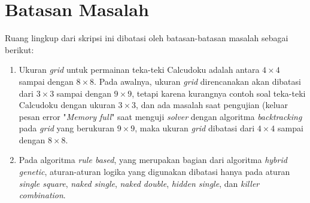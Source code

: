 \section{Batasan Masalah}
\label{sec:batasan}
Ruang lingkup dari skripsi ini dibatasi oleh batasan-batasan masalah sebagai berikut:
\begin{enumerate}
\item Ukuran \textit{grid} untuk permainan teka-teki Calcudoku adalah antara \begin{math}4 \times 4\end{math} sampai dengan \begin{math}8 \times 8\end{math}. Pada awalnya, ukuran \textit{grid} direncanakan akan dibatasi dari \begin{math}3 \times 3\end{math} sampai dengan \begin{math}9 \times 9\end{math}, tetapi karena kurangnya contoh soal teka-teki Calcudoku dengan ukuran \begin{math}3 \times 3\end{math}, dan ada masalah saat pengujian (keluar pesan error "\textit{Memory full}" saat menguji \textit{solver} dengan algoritma \textit{backtracking} pada \textit{grid} yang berukuran \begin{math}9 \times 9\end{math}, maka ukuran \textit{grid} dibatasi dari \begin{math}4 \times 4\end{math} sampai dengan \begin{math}8 \times 8\end{math}.
\item Pada algoritma \textit{rule based}, yang merupakan bagian dari algoritma \textit{hybrid genetic}, aturan-aturan logika yang digunakan dibatasi hanya pada aturan \textit{single square}, \textit{naked single}, \textit{naked double}, \textit{hidden single}, dan \textit{killer combination}.
\end{enumerate}

